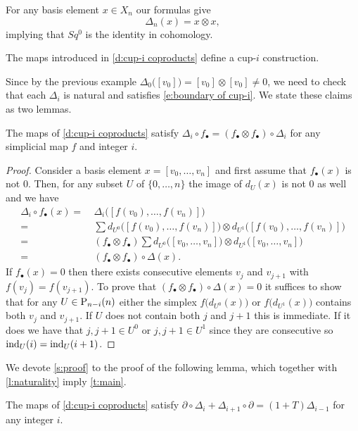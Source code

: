 \begin{example}
	For any basis element $x \in X_n$ our formulas give
	\begin{equation*}
	\Delta_n(x) = x \otimes x,
	\end{equation*}
	implying that $Sq^0$ is the identity in cohomology.
\end{example}

\begin{theorem} \label{t:main}
	The maps introduced in \cref{d:cup-i coproducts} define a cup-$i$ construction.
\end{theorem}

Since by the previous example $\Delta_0\big([v_0]\big) = [v_0] \otimes [v_0] \neq 0$, we need to check that each $\Delta_i$ is natural and satisfies \eqref{e:boundary of cup-i}.
We state these claims as two lemmas.

\begin{lemma} \label{l:naturality}
	The maps of \cref{d:cup-i coproducts} satisfy $\Delta_i \circ f_\bullet = (f_\bullet \otimes f_\bullet) \circ \Delta_i$ for any simplicial map $f$ and integer $i$.
\end{lemma}

\begin{proof}
	Consider a basis element $x = [v_0, \dots, v_n]$ and first assume that $f_\bullet(x)$ is not $0$.
	Then, for any subset $U$ of $\{0, \dots, n\}$ the image of $d_U(x)$ is not $0$ as well and we have
	\begin{align*}
	\Delta_i \circ f_\bullet(x) =\ &
	\Delta_i \big([f(v_0), \dots, f(v_n)]\big) \\ =\ &
	\sum d_{U^0} \big([f(v_0), \dots, f(v_n)]\big) \otimes d_{U^1} \big([f(v_0), \dots, f(v_n)]\big) \\ =\ &
	(f_\bullet \otimes f_\bullet) \sum d_{U^0} \big([v_0, \dots, v_n]\big) \otimes d_{U^1} \big([v_0, \dots, v_n]\big) \\ =\ &
	(f_\bullet \otimes f_\bullet) \circ \Delta(x).
	\end{align*}
	If $f_\bullet(x) = 0$ then there exists consecutive elements $v_j$ and $v_{j+1}$ with $f(v_j) = f(v_{j+1})$.
	To prove that $(f_\bullet \otimes f_\bullet) \circ \Delta(x) = 0$ it suffices to show that for any $U \in \P_{n-i}(n)$ either the simplex $f \big(d_{U^0}(x) \big)$ or $f \big( d_{U^1}(x) \big)$ contains both $v_j$ and $v_{j+1}$.
	If $U$ does not contain both $j$ and $j+1$ this is immediate.
	If it does we have that	$j, j+1 \in U^0$ or $j, j+1 \in U^1$ since they are consecutive so $\ind_U(i) = \ind_U(i+1)$.
\end{proof}

We devote \cref{s:proof} to the proof of the following lemma, which together with \cref{l:naturality} imply \cref{t:main}.

\begin{lemma} \label{l:main}
	The maps of \cref{d:cup-i coproducts} satisfy $\partial \circ \Delta_{i} + \Delta_{i+1} \circ \partial = (1+T) \Delta_{i-1}$ for any integer $i$.
\end{lemma}